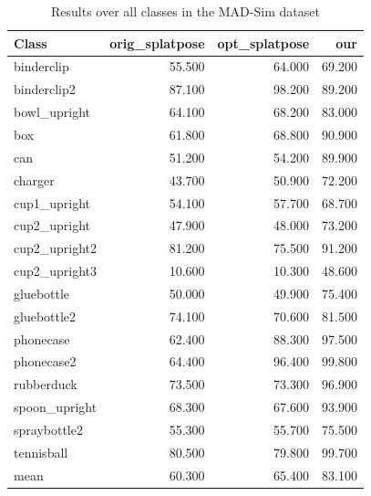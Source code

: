 \begin{table}[!htbp]
\centering
\scriptsize
\setlength{\tabcolsep}{4pt}
\renewcommand{\arraystretch}{0.95}
\begin{tabular}{l r r r}
\toprule
\textbf{Class} & \textbf{orig\_splatpose} & \textbf{opt\_splatpose} & \textbf{our} \\
\midrule
binderclip & 55.500 & 64.000 & 69.200 \\
binderclip2 & 87.100 & 98.200 & 89.200 \\
bowl\_upright & 64.100 & 68.200 & 83.000 \\
box & 61.800 & 68.800 & 90.900 \\
can & 51.200 & 54.200 & 89.900 \\
charger & 43.700 & 50.900 & 72.200 \\
cup1\_upright & 54.100 & 57.700 & 68.700 \\
cup2\_upright & 47.900 & 48.000 & 73.200 \\
cup2\_upright2 & 81.200 & 75.500 & 91.200 \\
cup2\_upright3 & 10.600 & 10.300 & 48.600 \\
gluebottle & 50.000 & 49.900 & 75.400 \\
gluebottle2 & 74.100 & 70.600 & 81.500 \\
phonecase & 62.400 & 88.300 & 97.500 \\
phonecase2 & 64.400 & 96.400 & 99.800 \\
rubberduck & 73.500 & 73.300 & 96.900 \\
spoon\_upright & 68.300 & 67.600 & 93.900 \\
spraybottle2 & 55.300 & 55.700 & 75.500 \\
tennisball & 80.500 & 79.800 & 99.700 \\
\midrule
mean & 60.300 & 65.400 & 83.100 \\
\bottomrule
\end{tabular}
\caption{Results over all classes in the MAD-Sim dataset}
\label{tab:results\_mad}
\end{table}